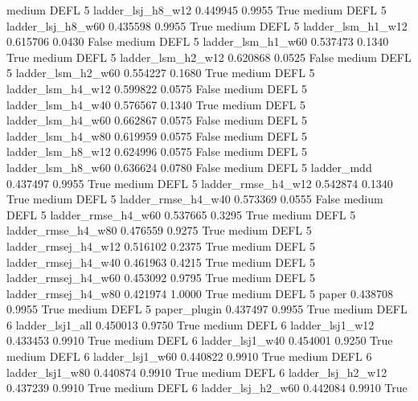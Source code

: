     medium     DEFL                 5   ladder_lsj_h8_w12   0.449945      0.9955    True
    medium     DEFL                 5   ladder_lsj_h8_w60   0.435598      0.9955    True
    medium     DEFL                 5   ladder_lsm_h1_w12   0.615706      0.0430   False
    medium     DEFL                 5   ladder_lsm_h1_w60   0.537473      0.1340    True
    medium     DEFL                 5   ladder_lsm_h2_w12   0.620868      0.0525   False
    medium     DEFL                 5   ladder_lsm_h2_w60   0.554227      0.1680    True
    medium     DEFL                 5   ladder_lsm_h4_w12   0.599822      0.0575   False
    medium     DEFL                 5   ladder_lsm_h4_w40   0.576567      0.1340    True
    medium     DEFL                 5   ladder_lsm_h4_w60   0.662867      0.0575   False
    medium     DEFL                 5   ladder_lsm_h4_w80   0.619959      0.0575   False
    medium     DEFL                 5   ladder_lsm_h8_w12   0.624996      0.0575   False
    medium     DEFL                 5   ladder_lsm_h8_w60   0.636624      0.0780   False
    medium     DEFL                 5          ladder_mdd   0.437497      0.9955    True
    medium     DEFL                 5  ladder_rmse_h4_w12   0.542874      0.1340    True
    medium     DEFL                 5  ladder_rmse_h4_w40   0.573369      0.0555   False
    medium     DEFL                 5  ladder_rmse_h4_w60   0.537665      0.3295    True
    medium     DEFL                 5  ladder_rmse_h4_w80   0.476559      0.9275    True
    medium     DEFL                 5 ladder_rmsej_h4_w12   0.516102      0.2375    True
    medium     DEFL                 5 ladder_rmsej_h4_w40   0.461963      0.4215    True
    medium     DEFL                 5 ladder_rmsej_h4_w60   0.453092      0.9795    True
    medium     DEFL                 5 ladder_rmsej_h4_w80   0.421974      1.0000    True
    medium     DEFL                 5               paper   0.438708      0.9955    True
    medium     DEFL                 5        paper_plugin   0.437497      0.9955    True
    medium     DEFL                 6     ladder_lsj1_all   0.450013      0.9750    True
    medium     DEFL                 6     ladder_lsj1_w12   0.433453      0.9910    True
    medium     DEFL                 6     ladder_lsj1_w40   0.454001      0.9250    True
    medium     DEFL                 6     ladder_lsj1_w60   0.440822      0.9910    True
    medium     DEFL                 6     ladder_lsj1_w80   0.440874      0.9910    True
    medium     DEFL                 6   ladder_lsj_h2_w12   0.437239      0.9910    True
    medium     DEFL                 6   ladder_lsj_h2_w60   0.442084      0.9910    True
